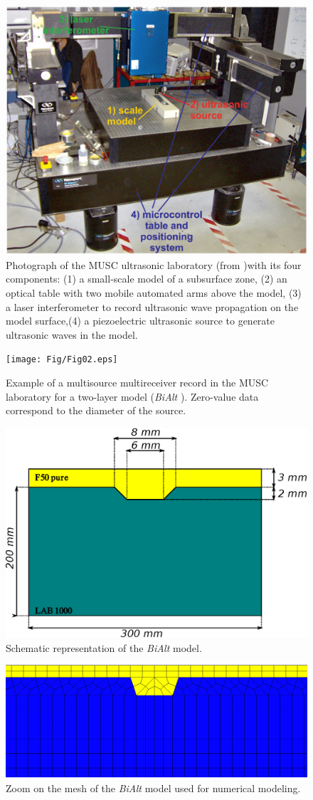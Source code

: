 \documentclass[extra,mreferee]{gji}
\newcommand{\bialt}{\textit{BiAlt} }
\begin{document}
\begin{figure}
\centering
\includegraphics[width=0.50\columnwidth]{Fig/Fig01.eps}
\caption{Photograph of the MUSC ultrasonic laboratory (from \cite{Bretaudeau_FWI_2013} )with its four components: (1) a small-scale model of a subsurface zone, (2) an optical table with two mobile automated arms above the model, (3) a laser interferometer to record ultrasonic wave propagation on the model surface,(4) a piezoelectric ultrasonic source to generate ultrasonic waves in the model.}
\label{Fig:Fig01}
\end{figure}

\clearpage
\newpage

\begin{figure}
\centering
\texttt{[image: Fig/Fig02.eps]}
\caption{Example of a multisource multireceiver record in the MUSC laboratory for a two-layer model (\bialt). Zero-value data correspond to the diameter of the source.}
\label{Fig:Fig02}
\end{figure}

\clearpage
\newpage

\begin{figure}
\centering
\includegraphics[width=0.50\columnwidth]{Fig/Fig03.eps}
\caption{Schematic representation of the \bialt model.}
\label{Fig:Fig03}
\end{figure}

\clearpage
\newpage

\begin{figure}
\centering
\includegraphics[width=0.50\columnwidth]{Fig/Fig04.eps}
\caption{Zoom on the mesh of the \bialt model used for numerical modeling.}
\label{Fig:Fig04}
\end{figure}
\end{document}
